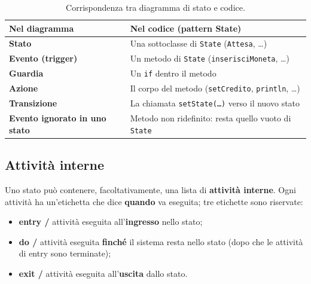\begin{table}[H]
\centering
\renewcommand{\arraystretch}{1.35}
\begin{tabularx}{\textwidth}{>{\bfseries}P{4.2cm} L}
\toprule
Nel diagramma & Nel codice (pattern State) \\
\midrule
Stato & Una sottoclasse di \texttt{State} (\texttt{Attesa}, \ldots) \\
Evento (trigger) & Un metodo di \texttt{State} (\texttt{inserisciMoneta}, \ldots) \\
Guardia & Un \texttt{if} dentro il metodo \\
Azione & Il corpo del metodo (\texttt{setCredito}, \texttt{println}, \ldots) \\
Transizione & La chiamata \texttt{setState(\ldots)} verso il nuovo stato \\
Evento ignorato in uno stato & Metodo non ridefinito: resta quello vuoto di \texttt{State} \\
\bottomrule
\end{tabularx}
\caption{Corrispondenza tra diagramma di stato e codice.}
\end{table}


\subsection{Attività interne}

Uno stato può contenere, facoltativamente, una lista di \textbf{attività interne}. Ogni attività ha un'etichetta che dice
\textbf{quando} va eseguita; tre etichette sono riservate:
\begin{itemize}
  \item \textbf{entry /} attività eseguita all'\textbf{ingresso} nello stato;
  \item \textbf{do /} attività eseguita \textbf{finché} il sistema resta nello stato (dopo che le attività di entry sono terminate);
  \item \textbf{exit /} attività eseguita all'\textbf{uscita} dallo stato.
\end{itemize}

